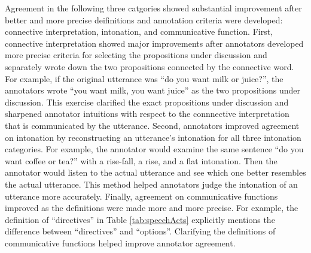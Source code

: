 \documentclass[oneside]{report}
\theoremstyle{definition}
\theoremstyle{definition}
\theoremstyle{definition}
\theoremstyle{remark}
\begin{document}
Agreement in the following three catgories showed substantial
improvement after better and more precise deifinitions and annotation
criteria were developed: connective interpretation, intonation, and
communicative function. First, connective interpretation showed major
improvements after annotators developed more precise criteria for
selecting the propositions under discussion and separately wrote down
the two propositions connected by the connective word. For example, if
the original utterance was ``do you want milk or juice?'', the
annotators wrote ``you want milk, you want juice'' as the two
propositions under discussion. This exercise clarified the exact
propositions under discussion and sharpened annotator intuitions with
respect to the connnective interpretation that is communicated by the
utterance. Second, annotators improved agreement on intonation by
reconstructing an utterance's intonation for all three intonation
categories. For example, the annotator would examine the same sentence
``do you want coffee or tea?'' with a rise-fall, a rise, and a flat
intonation. Then the annotator would listen to the actual utterance and
see which one better resembles the actual utterance. This method helped
annotators judge the intonation of an utterance more accurately.
Finally, agreement on communicative functions improved as the
definitions were made more and more precise. For example, the definition
of ``directives'' in Table \ref{tab:speechActs} explicitly mentions the
difference between ``directives'' and ``options''. Clarifying the
definitions of communicative functions helped improve annotator
agreement.
\end{document}
